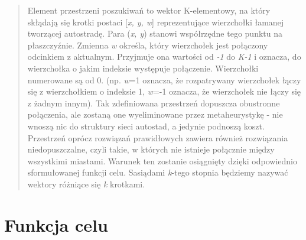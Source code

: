 \documentclass[a4paper]{article}
\begin{document}
\begin{quote}
Element przestrzeni poszukiwań to wektor K-elementowy, na który skłądają się krotki postaci [\textit{x, y, w}] reprezentujące wierzchołki łamanej tworzącej autostradę. \linebreak Para (\textit{x, y}) stanowi współrzędne tego punktu na płaszczyźnie. Zmienna \textit{w} określa, który wierzchołek jest połączony odcinkiem z aktualnym. Przyjmuje ona wartości od \textit{-1} do \textit{K-1} i oznacza, do wierzchołka o jakim indeksie występuje połączenie. Wierzchołki numerowane są od 0. (np. \textit{w}=1 oznacza, że rozpatrywany wierzchołek łączy się z wierzchołkiem o indeksie 1, \textit{w}=-1 oznacza, że wierzchołek nie łączy się z żadnym innym). Tak zdefiniowana przestrzeń dopuszcza obustronne połączenia, ale zostaną one wyeliminowane przez metaheurystykę - nie wnoszą nic do struktury sieci autostad, a jedynie podnoszą koszt. Przestrzeń oprócz rozwiązań prawidłowych zawiera również rozwiązania niedopuszczalne, czyli takie, w których nie istnieje połącznie między wszystkimi miastami. Warunek ten zostanie osiągnięty dzięki odpowiednio sformułowanej funkcji celu. Sasiądami \textit{k}-tego stopnia będziemy nazywać wektory różniące się \textit{k} krotkami.
\end{quote}

\section{Funkcja celu}
\end{document}
